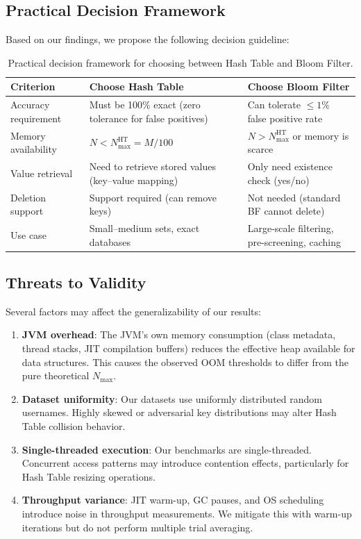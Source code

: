 \subsection{Practical Decision Framework}
\label{subsec:framework}

Based on our findings, we propose the following decision guideline:

\begin{table}[h]
\centering
\caption{Practical decision framework for choosing between Hash Table and Bloom Filter.}
\label{tab:decision}
\begin{tabular}{@{}p{3.8cm}p{5.5cm}p{5.5cm}@{}}
\toprule
\textbf{Criterion} & \textbf{Choose Hash Table} & \textbf{Choose Bloom Filter} \\
\midrule
Accuracy requirement & Must be 100\% exact (zero tolerance for false positives) & Can tolerate ${\leq}1\%$ false positive rate \\
\addlinespace
Memory availability  & $N < N_{\max}^{\text{HT}} = M / 100$ & $N > N_{\max}^{\text{HT}}$ or memory is scarce \\
\addlinespace
Value retrieval      & Need to retrieve stored values (key--value mapping) & Only need existence check (yes/no) \\
\addlinespace
Deletion support     & Support required (can remove keys) & Not needed (standard BF cannot delete) \\
\addlinespace
Use case             & Small--medium sets, exact databases & Large-scale filtering, pre-screening, caching \\
\bottomrule
\end{tabular}
\end{table}

\subsection{Threats to Validity}
\label{subsec:threats}

Several factors may affect the generalizability of our results:

\begin{enumerate}[nosep, label=(\roman*)]
    \item \textbf{JVM overhead}: The JVM's own memory consumption (class metadata, thread stacks, JIT compilation buffers) reduces the effective heap available for data structures. This causes the observed OOM thresholds to differ from the pure theoretical $N_{\max}$.
    \item \textbf{Dataset uniformity}: Our datasets use uniformly distributed random usernames. Highly skewed or adversarial key distributions may alter Hash Table collision behavior.
    \item \textbf{Single-threaded execution}: Our benchmarks are single-threaded. Concurrent access patterns may introduce contention effects, particularly for Hash Table resizing operations.
    \item \textbf{Throughput variance}: JIT warm-up, GC pauses, and OS scheduling introduce noise in throughput measurements. We mitigate this with warm-up iterations but do not perform multiple trial averaging.
\end{enumerate}

